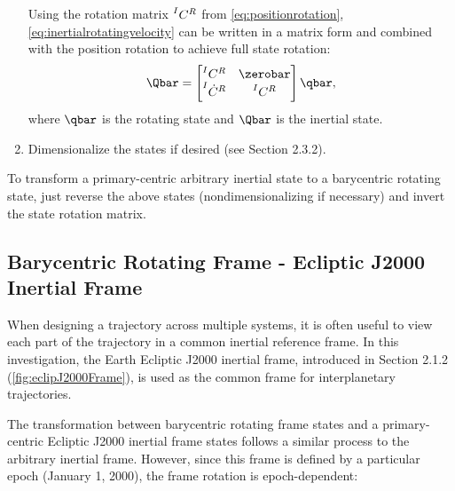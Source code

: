 \begin{enumerate}
            Using the rotation matrix $\prescript{I}{}{C}^{R}$ from \cref{eq:positionrotation},
            \cref{eq:inertialrotatingvelocity} can be written in a matrix form and combined with
            the position rotation to achieve full state rotation:
            \begin{equation}
                \Qbar=\begin{bmatrix}   \prescript{I}{}{C}^{R}      &   \zerobar                \\
                                        \prescript{I}{}{\dot{C}}^{R} &   \prescript{I}{}{C}^{R}  \end{bmatrix}\qbar,
                \label{eq:rotation}
            \end{equation}
            where $\qbar$ is the rotating state and $\Qbar$ is the inertial state.
    \item   Dimensionalize the states if desired (see Section 2.3.2).
\end{enumerate}

To transform a primary-centric arbitrary inertial state to a barycentric rotating state, just
reverse the above states (nondimensionalizing if necessary) and invert the state rotation matrix.

\subsection{Barycentric Rotating Frame - Ecliptic J2000 Inertial Frame}
When designing a trajectory across multiple systems, it is often useful to view each part of the
trajectory in a common inertial reference frame. In this investigation, the Earth Ecliptic J2000
inertial frame, introduced in Section 2.1.2 (\cref{fig:eclipJ2000Frame}), is used as the common
frame for interplanetary trajectories.

The transformation between barycentric rotating frame states and a primary-centric Ecliptic J2000
inertial frame states follows a similar process to the arbitrary inertial frame. However, since
this frame is defined by a particular epoch (January 1, 2000), the frame rotation is
epoch-dependent:

